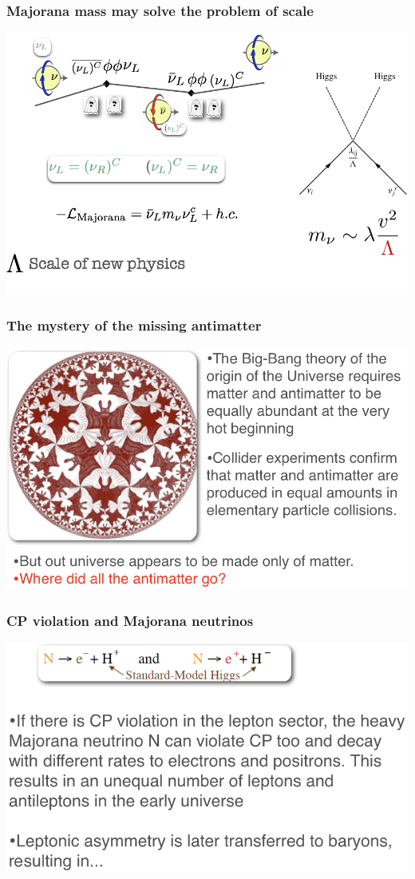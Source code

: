 \begin{frame}
\frametitle{Majorana mass may solve the problem of scale}
\includegraphics[scale=0.30]{img/MajoranaMass.png}
\end{frame}




\begin{frame}
\frametitle{The mystery of the missing antimatter}
\includegraphics[scale=0.30]{img/MissingAntiMatter.png}
\end{frame}

\begin{frame}
\frametitle{CP violation and Majorana neutrinos}
\includegraphics[scale=0.30]{img/CP.png}
\end{frame}

